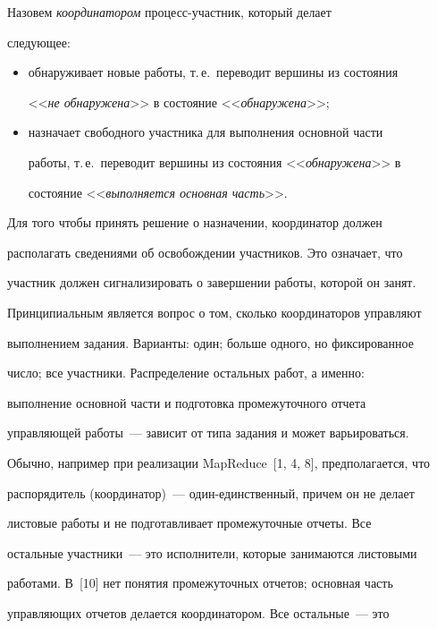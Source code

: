       


      Назовем \textit{координатором} процесс-участ\-ник, который делает 


следующее:


      \begin{itemize}


\item обнаруживает новые работы, т.\,е.\ переводит вершины из состояния 


<<\textit{не обнаружена}>> в состояние <<\textit{обнаружена}>>;\\[-15pt]


\item назначает свободного участника для выполнения основной части 


работы, т.\,е.\ переводит вершины из состояния <<\textit{обнаружена}>> в 


состояние <<\textit{выполняется основная часть}>>.


\end{itemize}


Для того чтобы принять решение о назначении, координатор должен 


располагать сведениями об освобождении участников. Это означает, что 


участник должен сигнализировать о завершении работы, которой он занят. 


Принципиальным является вопрос о том, сколько координаторов управляют 


выполнением задания. Варианты: один; больше одного, но фиксированное 


число; все участники. Распределение остальных работ, а именно:


выполнение основной части и подготовка промежуточного отчета 


управляющей работы~--- зависит от типа задания и может варьироваться. 


Обычно, например при реализации MapReduce~[1, 4, 8], предполагается, что 


распорядитель (координатор)~--- один-един\-ст\-венный, причем он не делает 


листовые работы и не подготавливает промежуточные отчеты. Все 


остальные участники~--- это исполнители, которые занимаются листовыми 


работами. В~[10] нет понятия промежуточных отчетов; основная часть 


управляющих отчетов делается координатором. Все остальные~--- это 


